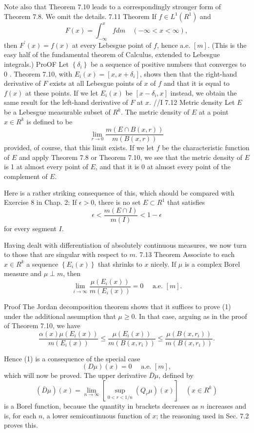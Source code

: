 Note also that Theorem 7.10 leads to a correspondingly stronger form of Theorem 7.8. We omit the details.
7.11 Theorem If $f \in L^1\left(R^1\right)$ and
$$
F(x)=\int_{-\infty}^x f d m \quad(-\infty<x<\infty),
$$
then $F^{\prime}(x)=f(x)$ at every Lebesgue point of $f$, hence a.e. $[m]$.
(This is the easy half of the fundamental theorem of Calculus, extended to Lebesgue integrals.)
ProOF Let $\left\{\delta_i\right\}$ be a sequence of positive numbers that converges to 0 . Theorem 7.10, with $E_i(x)=\left[x, x+\delta_i\right]$, shows then that the right-hand derivative of $F$ exists at all Lebesgue points of $x$ of $f$ and that it is equal to $f(x)$ at these points. If we let $E_i(x)$ be $\left[x-\delta_i, x\right]$ instead, we obtain the same result for the left-hand derivative of $F$ at $x$.
//I
7.12 Metric density Let $E$ be a Lebesgue measurable subset of $R^k$. The metric density of $E$ at a point $x \in R^k$ is defined to be
$$
\lim _{r \rightarrow 0} \frac{m(E \cap B(x, r))}{m(B(x, r))}
$$
provided, of course, that this limit exists.
If we let $f$ be the characteristic function of $E$ and apply Theorem 7.8 or Theorem 7.10, we see that the metric density of $E$ is 1 at almost every point of $E$, and that it is 0 at almost every point of the complement of $E$.

Here is a rather striking consequence of this, which should be compared with Exercise 8 in Chap. 2:
If $\epsilon>0$, there is no set $E \subset R^1$ that satisfies
$$
\epsilon<\frac{m(E \cap I)}{m(I)}<1-\epsilon
$$
for every segment $I$.

Having dealt with differentiation of absolutely continuous measures, we now turn to those that are singular with respect to $m$.
7.13 Theorem Associate to each $x \in R^k$ a sequence $\left\{E_i(x)\right\}$ that shrinks to $x$ nicely. If $\mu$ is a complex Borel measure and $\mu \perp m$, then
$$
\lim _{i \rightarrow \infty} \frac{\mu\left(E_i(x)\right)}{m\left(E_i(x)\right)}=0 \quad \text { a.e. }[m] .
$$

Proof The Jordan decomposition theorem shows that it suffices to prove (1) under the additional assumption that $\mu \geq 0$. In that case, arguing as in the proof of Theorem 7.10, we have
$$
\frac{\alpha(x) \mu\left(E_i(x)\right)}{m\left(E_i(x)\right)} \leq \frac{\mu\left(E_i(x)\right)}{m\left(B\left(x, r_i\right)\right)} \leq \frac{\mu\left(B\left(x, r_i\right)\right)}{m\left(B\left(x, r_i\right)\right)} .
$$

Hence (1) is a consequence of the special case
$$
(D \mu)(x)=0 \quad \text { a.e. }[m],
$$
which will now be proved.
The upper derivative $\bar{D} \mu$, defined by
$$
(\bar{D} \mu)(x)=\lim _{n \rightarrow \infty}\left[\sup _{0<r<1 / n}\left(Q_r \mu\right)(x)\right] \quad\left(x \in R^k\right)
$$
is a Borel function, because the quantity in brackets decreases as $n$ increases and is, for each $n$, a lower semicontinuous function of $x$; the reasoning used in Sec. 7.2 proves this.

